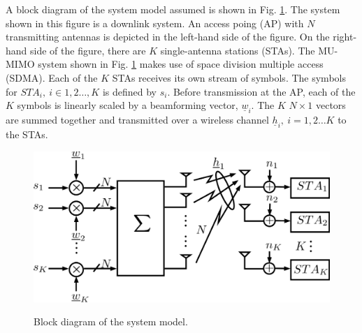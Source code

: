 A block diagram of the system model assumed is shown in Fig. \ref{fig:sys_bd}. The system shown in this figure is a downlink system. An access poing (AP) with $N$ transmitting antennas is depicted in the left-hand side of the figure. On the right-hand side of the figure, there are $K$ single-antenna stations (STAs). The MU-MIMO system shown in Fig. \ref{fig:sys_bd} makes use of space division multiple access (SDMA). Each of the $K$ STAs receives its own stream of symbols. The symbols for $STA_i,\ i\in 1,2\ldots,K$ is defined by $s_i$. Before transmission at the AP, each of the $K$ symbols is linearly scaled by a beamforming vector, $\underline w_i$. The $K$ $N \times 1$ vectors are summed together and transmitted over a wireless channel $\underline h_i,\ i= 1,2\ldots K$ to the STAs.
\begin{figure}
    \includegraphics[width=12cm]{figs/system_desc.png}\\
    \caption{Block diagram of the system model.}
    \label{fig:sys_bd}
\end{figure}
